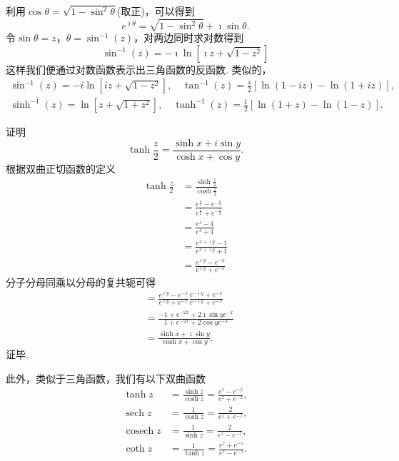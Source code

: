 利用$\cos \theta = \sqrt{1 - \sin ^2 \theta }$(取正)，可以得到
\begin{equation}
  e^{\imath \theta} = \sqrt{ 1 - \sin ^2 \theta } + \imath \sin \theta .  
\end{equation} 
令$\sin \theta = z$，$\theta = \sin^{-1} (z)$，对两边同时求对数得到
\begin{equation}
    \sin^{-1} (z) = -\imath \ln \left[ \imath z + \sqrt{1-z^2} \right]
\end{equation}
这样我们便通过对数函数表示出三角函数的反函数.
类似的，
\begin{equation}
    \begin{array}{cc}
    \sin ^{-1}(z)=-i \ln \left[i z+\sqrt{1-z^2}\right], \quad \tan ^{-1}(z)=\frac{i}{2}[\ln (1-i z)-\ln (1+i z)], \\
    \sinh ^{-1}(z)=\ln \left[z+\sqrt{1+z^2}\right], \quad \tanh ^{-1}(z)=\frac{1}{2}[\ln (1+z)-\ln (1-z)] .
    \end{array}
\end{equation}

\begin{examplebox}{证明
    \begin{equation*}\tanh \frac{z}{2}=\frac{\sinh x+i \sin y}{\cosh x+\cos y} .  
    \end{equation*}
}
根据双曲正切函数的定义
\begin{align*}
    \tanh \frac{z}{2} &= \frac{\sinh \frac{z}{2} }{ \cosh \frac{z}{2}}
    \\
    &= \frac{e^{\frac{z}{2}} - e^{-\frac{z}{2}}}{e^{\frac{z}{2}} + e^{-\frac{z}{2}}}
    \\
    &= \frac{e^{z} - 1}{e^{z} + 1} 
    \\
    &= \frac{e^{x+\imath y } -1 } { e^{x + \imath y } + 1}
    \\
    &=\frac{e^{\imath y } -e^{-x} } { e^{\imath y } + e^{-x}}
\end{align*}   
分子分母同乘以分母的复共轭可得
\begin{align*}
    &=\frac{e^{\imath y } -e^{-x} } { e^{\imath y } + e^{-x}} \frac{e^{-\imath y } + e^{-x}} { e^{-\imath y } + e^{-x}}
    \\
    &=\frac{-1+e^{-2x} + 2 \imath \sin y e^{-x}}{1+ e^{-2x} + 2 \cos y e^{-x} }
    \\
    &= \frac{\sinh x + \imath \sin y} {\cosh x + \cos y} .  
\end{align*}
证毕.
\end{examplebox}

此外，类似于三角函数，我们有以下双曲函数
\begin{equation}
    \begin{aligned}
    \tanh z & =\frac{\sinh z}{\cosh z}=\frac{e^z-e^{-z}}{e^z+e^{-z}}, \\
    \operatorname{sech} z & =\frac{1}{\cosh z}=\frac{2}{e^z+e^{-z}}, \\
    \operatorname{cosech} z & =\frac{1}{\sinh z}=\frac{2}{e^z-e^{-z}}, \\
    \operatorname{coth} z & =\frac{1}{\tanh z}=\frac{e^z+e^{-z}}{e^z-e^{-z}} . 
    \end{aligned}
\end{equation}


